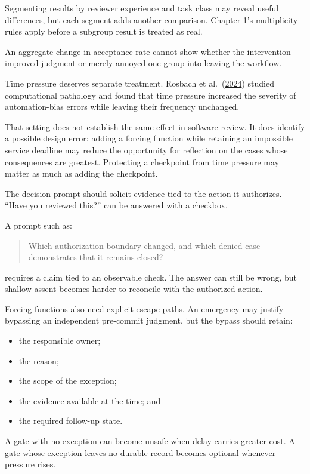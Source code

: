 Segmenting results by reviewer experience and task class may reveal useful differences, but each segment adds another comparison. Chapter 1's multiplicity rules apply before a subgroup result is treated as real.

An aggregate change in acceptance rate cannot show whether the intervention improved judgment or merely annoyed one group into leaving the workflow.

Time pressure deserves separate treatment. Rosbach et al.~(\href{https://arxiv.org/abs/2411.00998}{2024}) studied computational pathology and found that time pressure increased the severity of automation-bias errors while leaving their frequency unchanged.

That setting does not establish the same effect in software review. It does identify a possible design error: adding a forcing function while retaining an impossible service deadline may reduce the opportunity for reflection on the cases whose consequences are greatest. Protecting a checkpoint from time pressure may matter as much as adding the checkpoint.

The decision prompt should solicit evidence tied to the action it authorizes. ``Have you reviewed this?'' can be answered with a checkbox.

A prompt such as:

\begin{quote}
Which authorization boundary changed, and which denied case demonstrates that it remains closed?
\end{quote}

requires a claim tied to an observable check. The answer can still be wrong, but shallow assent becomes harder to reconcile with the authorized action.

Forcing functions also need explicit escape paths. An emergency may justify bypassing an independent pre-commit judgment, but the bypass should retain:

\begin{itemize}
\tightlist
\item
  the responsible owner;
\item
  the reason;
\item
  the scope of the exception;
\item
  the evidence available at the time; and
\item
  the required follow-up state.
\end{itemize}

A gate with no exception can become unsafe when delay carries greater cost. A gate whose exception leaves no durable record becomes optional whenever pressure rises.

